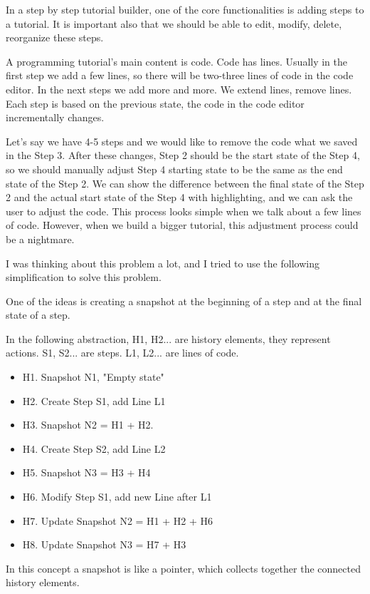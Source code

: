 \documentclass[12pt, a4paper, oneside, openright, medskipamount]{report}
\begin{document}
In a step by step tutorial builder, one of the core functionalities is adding steps to a tutorial. It is important also that we should be able to edit, modify, delete, reorganize these steps.

A programming tutorial’s main content is code. Code has lines. Usually in the first step we add a few lines, so there will be two-three lines of code in the code editor. In the next steps we add more and more. We extend lines, remove lines. Each step is based on the previous state, the code in the code editor incrementally changes.

Let's say we have 4-5 steps and we would like to remove the code what we saved in the Step 3. After these changes, Step 2 should be the start state of the Step 4, so we should manually adjust Step 4 starting state to be the same as the end state of the Step 2. We can show the difference between the final state of the Step 2 and the actual start state of the Step 4 with highlighting, and we can ask the user to adjust the code. This process looks simple when we talk about a few lines of code. However, when we build a bigger tutorial, this adjustment process could be a nightmare.

I was thinking about this problem a lot, and I tried to use the following simplification to solve this problem.

One of the ideas is creating a snapshot at the beginning of a step and at the final state of a step.

In the following abstraction, H1, H2... are history elements, they represent actions. S1, S2... are steps. L1, L2... are lines of code.

\begin{itemize}[noitemsep]
\item H1. Snapshot N1, "Empty state"
\item H2. Create Step S1, add Line L1
\item H3. Snapshot N2 = H1 + H2.
\item H4. Create Step S2, add Line L2
\item H5. Snapshot N3 = H3 + H4
\item H6. Modify Step S1, add new Line after L1
\item H7. Update Snapshot N2 = H1 + H2 + H6
\item H8. Update Snapshot N3 = H7 + H3
\end{itemize}

In this concept a snapshot is like a pointer, which collects together the connected history elements.
\end{document}

